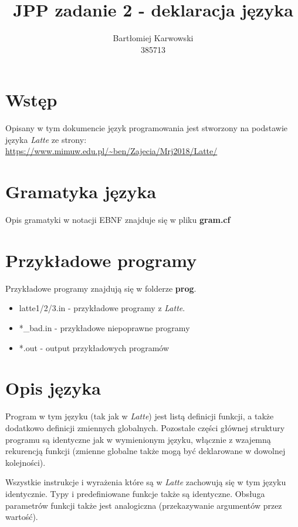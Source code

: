 \documentclass{article}
\title{JPP zadanie 2 - deklaracja języka}
\author{Bartłomiej Karwowski\\385713}
\date{}
\begin{document}
\maketitle

\section{Wstęp}

Opisany w tym dokumencie język programowania jest stworzony na podstawie języka \textit{Latte} ze strony:\\

\url{https://www.mimuw.edu.pl/~ben/Zajecia/Mrj2018/Latte/}

\section{Gramatyka języka}

Opis gramatyki w notacji EBNF znajduje się w pliku \textbf{gram.cf}

\section{Przykładowe programy}

Przykładowe programy znajdują się w folderze \textbf{prog}.

\begin{itemize}
    \item latte1/2/3.in - przykładowe programy z \textit{Latte}.
    \item *\_bad.in - przykładowe niepoprawne programy
    \item *.out - output przykładowych programów
\end{itemize}

\newpage
\section{Opis języka}

Program w tym języku (tak jak w \textit{Latte}) jest listą definicji funkcji, a także dodatkowo definicji zmiennych globalnych. Pozostałe części głównej struktury programu są identyczne jak w wymienionym języku, włącznie z wzajemną rekurencją funkcji (zmienne globalne także mogą być deklarowane w dowolnej kolejności).

Wszystkie instrukcje i wyrażenia które są w \textit{Latte} zachowują się w tym języku identycznie. Typy i predefiniowane funkcje także są identyczne. Obsługa parametrów funkcji także jest analogiczna (przekazywanie argumentów przez wartość).
\end{document}
